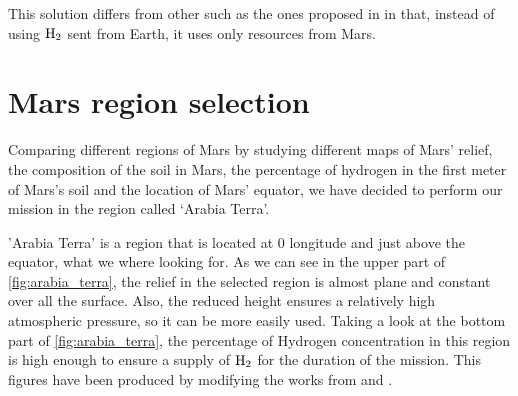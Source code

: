 \documentclass[twocolumn]{article}
\newcommand{\Htwo}{\textnormal{H}_2}
\begin{document}
This solution differs from other such as the ones proposed in 
\cite{mars_direct} in that, instead of using $\Htwo$ sent from Earth, it uses 
only resources from Mars.

\section{Mars region selection}

Comparing different regions of Mars by studying different maps of Mars' relief, 
the composition of the soil in Mars, the percentage of hydrogen in the first 
meter of Mars's soil and the location of Mars' equator, we have decided to 
perform our mission in the region called `Arabia Terra'. 

'Arabia Terra' is a region that is located at 0 longitude and just above the 
equator, what we where looking for. As we can see in the upper part of 
\autoref{fig:arabia_terra}, the relief in the selected region is almost plane 
and constant over all the surface. Also, the reduced height ensures a 
relatively high atmospheric pressure, so it can be more easily used. 
Taking a look at the bottom part of \autoref{fig:arabia_terra}, the percentage 
of Hydrogen concentration in this region is high enough to ensure a supply of 
$\Htwo$ for the duration of the mission. This figures have been produced by 
modifying the works from \cite{mars_elevation_and_boundaries} and 
\cite{water_on_mars}.
\end{document}
